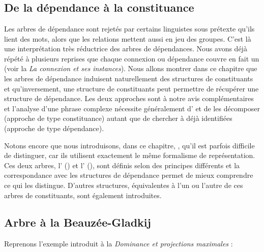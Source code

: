 \chapter{}\label{sec:3.4}

\section{De la dépendance à la constituance}\label{sec:3.4.0}

Les arbres de dépendance sont rejetés par certains linguistes sous prétexte qu’ils lient des mots, alors que les relations mettent aussi en jeu des groupes. C’est là une interprétation très réductrice des arbres de dépendances. Nous avons déjà répété à plusieurs reprises que chaque connexion ou dépendance couvre en fait un  (voir la  \textit{La connexion et ses instances}). Nous allons montrer dans ce chapitre que les arbres de dépendance induisent naturellement des structures de constituants et qu’inversement, une structure de constituants peut permettre de récupérer une structure de dépendance. Les deux approches sont à notre avis complémentaires et l’analyse d’une phrase complexe nécessite généralement d’ et de les décomposer (approche de type constituance) autant que de chercher à  déjà identifiées (approche de type dépendance).

Notons encore que nous introduisons, dans ce chapitre,  , qu’il est parfois difficile de distinguer, car ils utilisent exactement le même formalisme de représentation. Ces deux arbres, l’ () et l’ (), sont définis selon des principes différents et la correspondance avec les structures de dépendance permet de mieux comprendre ce qui les distingue. D’autres structures, équivalentes à l’un ou l’autre de ces arbres de constituants, sont également introduites.

\section{ Arbre à la Beauzée-Gladkij}\label{sec:3.4.1}

Reprenons l’exemple introduit à la  \textit{Dominance et projections maximales} :

